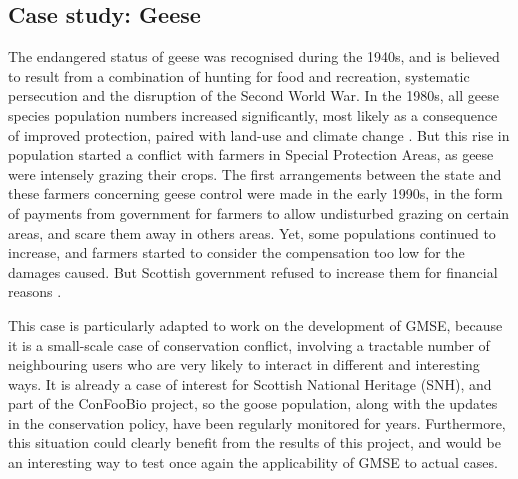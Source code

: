 \documentclass[12pt,a4paper]{article}
\begin{document}
\subsection{Case study: Geese}

The endangered status of geese was recognised during the 1940s, and is believed to result from a combination of hunting for food and recreation, systematic persecution and the disruption of the Second World War.
In the 1980s, all geese species population numbers increased significantly, most likely as a consequence of improved protection, paired with land-use and climate change \citep{mason2017changing}.
But this rise in population started a conflict with farmers in Special Protection Areas, as geese were intensely grazing their crops.
The first arrangements between the state and these farmers concerning geese control were made in the early 1990s, in the form of payments from government for farmers to allow undisturbed grazing on certain areas, and scare them away in others areas.
Yet, some populations continued to increase, and farmers started to consider the compensation too low for the damages caused.
But Scottish government refused to increase them for financial reasons \citep{bainbridge2017goose}.

This case is particularly adapted to work on the development of GMSE, because it is a small-scale case of conservation conflict, involving a tractable number of neighbouring users who are very likely to interact in different and interesting ways.
It is already a case of interest for Scottish National Heritage (SNH), and part of the ConFooBio project, so the goose population, along with the updates in the conservation policy, have been regularly monitored for years.
Furthermore, this situation could clearly benefit from the results of this project, and would be an interesting way to test once again the applicability of GMSE to actual cases.
\end{document}
